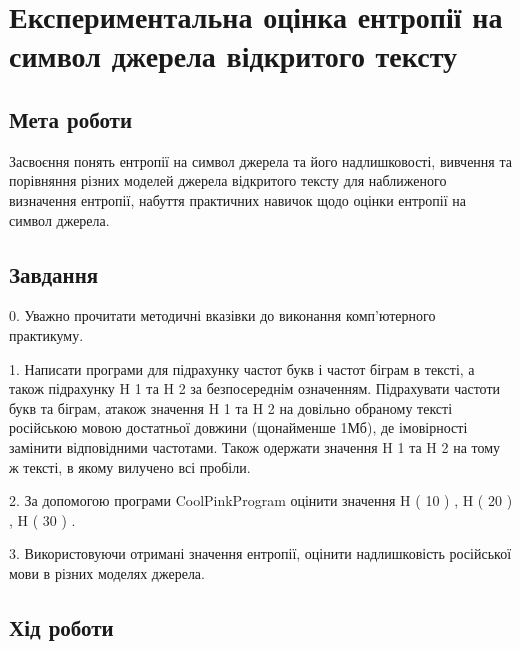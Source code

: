 \chapter{Експериментальна оцінка ентропії на символ джерела
відкритого тексту}

\section{Мета роботи}
Засвоєння понять ентропії на символ джерела та його надлишковості, вивчення та
порівняння різних моделей джерела відкритого тексту для наближеного визначення
ентропії, набуття практичних навичок щодо оцінки ентропії на символ джерела.

\section{Завдання}
0. Уважно прочитати методичні вказівки до виконання комп’ютерного практикуму.

1. Написати програми для підрахунку частот букв і частот біграм в тексті, а також
підрахунку H 1 та H 2 за безпосереднім означенням. Підрахувати частоти букв та біграм, атакож значення H 1 та H 2 на довільно обраному тексті російською мовою достатньої
довжини (щонайменше 1Мб), де імовірності замінити відповідними частотами. Також
одержати значення H 1 та H 2 на тому ж тексті, в якому вилучено всі пробіли.

2. За допомогою програми CoolPinkProgram оцінити значення H ( 10 ) , H ( 20 ) , H ( 30 ) .

3. Використовуючи отримані значення ентропії, оцінити надлишковість російської
мови в різних моделях джерела.

\section{Хід роботи}


